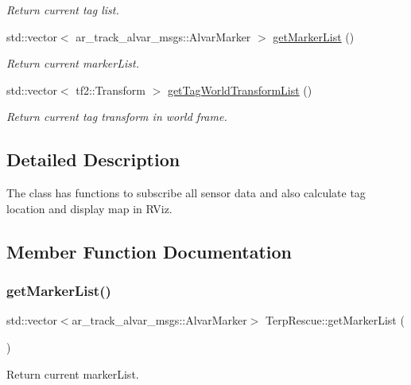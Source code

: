 \begin{DoxyCompactItemize}
\begin{DoxyCompactList}\small\item\em Return current tag list. \end{DoxyCompactList}\item 
std\+::vector$<$ ar\+\_\+track\+\_\+alvar\+\_\+msgs\+::\+Alvar\+Marker $>$ \hyperlink{classTerpRescue_af8d3ac4ae6ce279b003702e5b3b1e391}{get\+Marker\+List} ()
\begin{DoxyCompactList}\small\item\em Return current marker\+List. \end{DoxyCompactList}\item 
std\+::vector$<$ tf2\+::\+Transform $>$ \hyperlink{classTerpRescue_a390972c728cc524757421808e37f3bc2}{get\+Tag\+World\+Transform\+List} ()
\begin{DoxyCompactList}\small\item\em Return current tag transform in world frame. \end{DoxyCompactList}\end{DoxyCompactItemize}


\subsection{Detailed Description}
The class has functions to subscribe all sensor data and also calculate tag location and display map in R\+Viz. 

\subsection{Member Function Documentation}
\mbox{\label{classTerpRescue_af8d3ac4ae6ce279b003702e5b3b1e391}} 
\subsubsection{\texorpdfstring{get\+Marker\+List()}{getMarkerList()}}
{\footnotesize\ttfamily std\+::vector$<$ar\+\_\+track\+\_\+alvar\+\_\+msgs\+::\+Alvar\+Marker$>$ Terp\+Rescue\+::get\+Marker\+List (\begin{DoxyParamCaption}{ }\end{DoxyParamCaption})}



Return current marker\+List. 

